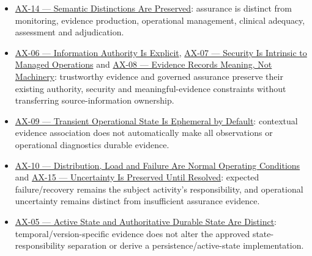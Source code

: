 \begin{itemize}

\item 
\href{https://github.com/fhirfactory/harmonia/blob/98410db60155198a75f74c79d98060070209faa1/docs/markdown/governance/architectural-axioms.md\#ax-14}{AX-14 — Semantic Distinctions Are Preserved}: assurance is distinct from monitoring, evidence production, operational management, clinical adequacy, assessment and adjudication.



\item 
\href{https://github.com/fhirfactory/harmonia/blob/98410db60155198a75f74c79d98060070209faa1/docs/markdown/governance/architectural-axioms.md\#ax-06}{AX-06 — Information Authority Is Explicit}, \href{https://github.com/fhirfactory/harmonia/blob/98410db60155198a75f74c79d98060070209faa1/docs/markdown/governance/architectural-axioms.md\#ax-07}{AX-07 — Security Is Intrinsic to Managed Operations} and \href{https://github.com/fhirfactory/harmonia/blob/98410db60155198a75f74c79d98060070209faa1/docs/markdown/governance/architectural-axioms.md\#ax-08}{AX-08 — Evidence Records Meaning, Not Machinery}: trustworthy evidence and governed assurance preserve their existing authority, security and meaningful-evidence constraints without transferring source-information ownership.



\item 
\href{https://github.com/fhirfactory/harmonia/blob/98410db60155198a75f74c79d98060070209faa1/docs/markdown/governance/architectural-axioms.md\#ax-09}{AX-09 — Transient Operational State Is Ephemeral by Default}: contextual evidence association does not automatically make all observations or operational diagnostics durable evidence.



\item 
\href{https://github.com/fhirfactory/harmonia/blob/98410db60155198a75f74c79d98060070209faa1/docs/markdown/governance/architectural-axioms.md\#ax-10}{AX-10 — Distribution, Load and Failure Are Normal Operating Conditions} and \href{https://github.com/fhirfactory/harmonia/blob/98410db60155198a75f74c79d98060070209faa1/docs/markdown/governance/architectural-axioms.md\#ax-15}{AX-15 — Uncertainty Is Preserved Until Resolved}: expected failure/\allowbreak{}recovery remains the subject activity's responsibility, and operational uncertainty remains distinct from insufficient assurance evidence.



\item 
\href{https://github.com/fhirfactory/harmonia/blob/98410db60155198a75f74c79d98060070209faa1/docs/markdown/governance/architectural-axioms.md\#ax-05}{AX-05 — Active State and Authoritative Durable State Are Distinct}: temporal/\allowbreak{}version-specific evidence does not alter the approved state-responsibility separation or derive a persistence/\allowbreak{}active-state implementation.



\end{itemize}
\label{rad:assurance-strategy:26}
